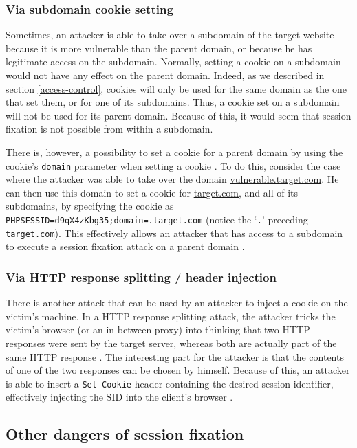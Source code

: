 \subsubsection{Via subdomain cookie setting}

Sometimes, an attacker is able to take over a subdomain of the target website because it is more vulnerable than the parent domain, or because he has legitimate access on the subdomain. Normally, setting a cookie on a subdomain would not have any effect on the parent domain. Indeed, as we described in section \ref{access-control}, cookies will only be used for the same domain as the one that set them, or for one of its subdomains. Thus, a cookie set on a subdomain will not be used for its parent domain. Because of this, it would seem that session fixation is not possible from within a subdomain.

There is, however, a possibility to set a cookie for a parent domain by using the cookie's \texttt{domain} parameter when setting a cookie \cite{rfc2109}. To do this, consider the case where the attacker was able to take over the domain \url{vulnerable.target.com}. He can then use this domain to set a cookie for \url{target.com}, and all of its subdomains, by specifying the cookie as \texttt{PHPSESSID=d9qX4zKbg35;domain=.target.com} (notice the `\texttt{.}' preceding \texttt{target.com}). This effectively allows an attacker that has access to a subdomain to execute a session fixation attack on a parent domain \cite{Kolsek2002}.

\subsubsection{Via HTTP response splitting / header injection}

There is another attack that can be used by an attacker to inject a cookie on the victim's machine. In a HTTP response splitting attack, the attacker tricks the victim's browser (or an in-between proxy) into thinking that two HTTP responses were sent by the target server, whereas both are actually part of the same HTTP response \cite{Klein2004}. The interesting part for the attacker is that the contents of one of the two responses can be chosen by himself. Because of this, an attacker is able to insert a \texttt{Set-Cookie} header containing the desired session identifier, effectively injecting the SID into the client's browser \cite{Johns2011}.

\subsection{Other dangers of session fixation}

